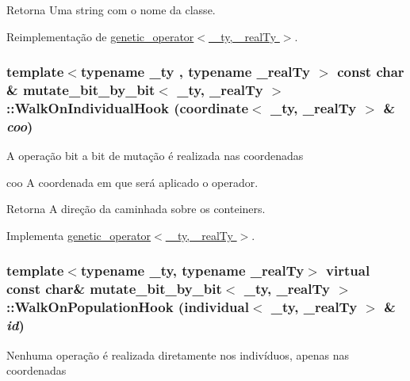 \begin{DoxyReturn}{Retorna}
Uma string com o nome da classe. 
\end{DoxyReturn}


Reimplementação de \hyperlink{classgenetic__operator_ae0f79368c0b4ad0cff3f608727bd87f5}{genetic\_\-operator$<$ \_\-ty, \_\-realTy $>$}.

\hypertarget{classmutate__bit__by__bit_a150b01e7ee79683012f7d60e8c1b9ccc}{
\subsubsection[{WalkOnIndividualHook}]{\setlength{\rightskip}{0pt plus 5cm}template$<$typename \_\-ty , typename \_\-realTy $>$ const char \& {\bf mutate\_\-bit\_\-by\_\-bit}$<$ \_\-ty, \_\-realTy $>$::WalkOnIndividualHook ({\bf coordinate}$<$ \_\-ty, \_\-realTy $>$ \& {\em coo})}}
\label{classmutate__bit__by__bit_a150b01e7ee79683012f7d60e8c1b9ccc}
A operação bit a bit de mutação é realizada nas coordenadas

coo A coordenada em que será aplicado o operador.

\begin{DoxyReturn}{Retorna}
A direção da caminhada sobre os conteiners. 
\end{DoxyReturn}


Implementa \hyperlink{classgenetic__operator_a2124d70b28b35d3114eb3e3ffa72baef}{genetic\_\-operator$<$ \_\-ty, \_\-realTy $>$}.

\hypertarget{classmutate__bit__by__bit_a2f8cc52a35943854f24b7534ecd90c7b}{
\subsubsection[{WalkOnPopulationHook}]{\setlength{\rightskip}{0pt plus 5cm}template$<$typename \_\-ty, typename \_\-realTy$>$ virtual const char\& {\bf mutate\_\-bit\_\-by\_\-bit}$<$ \_\-ty, \_\-realTy $>$::WalkOnPopulationHook ({\bf individual}$<$ \_\-ty, \_\-realTy $>$ \& {\em id})}}
\label{classmutate__bit__by__bit_a2f8cc52a35943854f24b7534ecd90c7b}
Nenhuma operação é realizada diretamente nos indivíduos, apenas nas coordenadas


